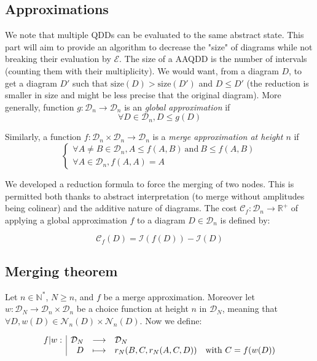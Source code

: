 \subsection{Approximations}

We note that multiple QDDs can be evaluated to the same abstract state. This part will aim to provide an algorithm to decrease the "size" of diagrams while not breaking their evaluation by $\mathcal{E}$. The size of a AAQDD is the number of intervals (counting them with their multiplicity). We would want, from a diagram $D$, to get a diagram $D'$ such that $\text{size}(D) > \text{size}(D')$ and $D \le D'$ (the reduction is smaller in size and might be less precise that the original diagram). More generally, function $g : \mathcal{D}_n \rightarrow \mathcal{D}_n$ is an \textit{global approximation} if
$$\forall D \in \mathcal{D}_n, D \le g(D)$$

Similarly, a function $f : \mathcal{D}_n \times \mathcal{D}_n \rightarrow \mathcal{D}_n$ is a \textit{merge approximation at height $n$} if
$$\begin{cases}
    \forall A \not= B \in \mathcal{D}_n, A \le f(A, B)~\text{and}~B \le f(A, B) \\
    \forall A \in \mathcal{D}_n, f(A, A) = A
\end{cases}
$$

We developed a reduction formula to force the merging of two nodes. This is permitted both thanks to abstract interpretation (to merge without amplitudes being colinear) and the additive nature of diagrams. The cost $\mathcal{C}_f : \mathcal{D}_n \rightarrow \mathbb{R}^+$ of applying a global approximation $f$ to a diagram $D \in \mathcal{D}_n$ is defined by:

$$\mathcal{C}_f(D) = \mathcal{I}(f(D)) - \mathcal{I}(D)$$

\subsection{Merging theorem}

Let $n \in \mathbb{N}^*$, $N \ge n$, and $f$ be a merge approximation. Moreover let $w : \mathcal{D}_N \rightarrow \mathcal{D}_n \times \mathcal{D}_n$ be a choice function at height $n$ in $\mathcal{D}_N$, meaning that $\forall D, w(D) \in \mathcal{N}_n(D) \times \mathcal{N}_n(D)$. Now we define:

$$\begin{array}{l|rcl} f | w: & \mathcal{D}_N & \longrightarrow & \mathcal{D}_N \\ & D & \longmapsto & r_N(B, C, r_N(A, C, D))\quad \text{with}~C = f(w(D)) \end{array}$$


